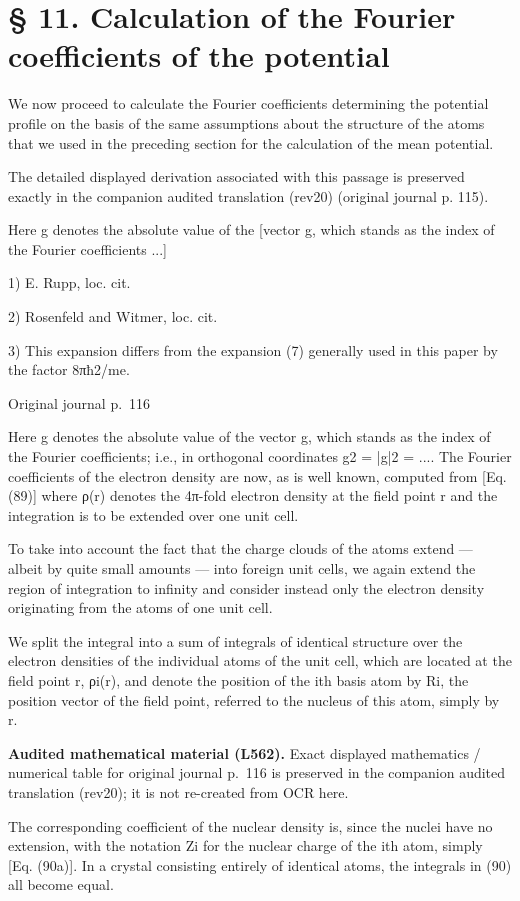 \documentclass[10pt]{article}
\newcommand{\origpage}[1]{\par\medskip\noindent\hfill{\small\color{notegray}Original journal p.~#1}\hfill\mbox{}\par\smallskip}
\newcommand{\mathref}[2]{\par\smallskip\noindent\colorbox{gray!8}{\parbox{0.95\linewidth}{\small\color{notegray}\textbf{Audited mathematical material (L#1).} Exact displayed mathematics / numerical table for original journal p.~#2 is preserved in the companion audited translation (rev20); it is not re-created from OCR here.}}\par\smallskip}
\begin{document}
\section*{§ 11. Calculation of the Fourier coefficients of the potential}
We now proceed to calculate the Fourier coefficients determining the potential profile on the basis of the same assumptions about the structure of the atoms that we used in the preceding section for the calculation of the mean potential.\par
The detailed displayed derivation associated with this passage is preserved exactly in the companion audited translation (rev20) (original journal p. 115).\par
Here g denotes the absolute value of the [vector g, which stands as the index of the Fourier coefficients ...]\par
\noindent\footnotesize 1) E. Rupp, loc. cit.\par\normalsize
\noindent\footnotesize 2) Rosenfeld and Witmer, loc. cit.\par\normalsize
\noindent\footnotesize 3) This expansion differs from the expansion (7) generally used in this paper by the factor 8πħ2/me.\par\normalsize
\origpage{116}
Here g denotes the absolute value of the vector g, which stands as the index of the Fourier coefficients; i.e., in orthogonal coordinates g2 = |g|2 = .... The Fourier coefficients of the electron density are now, as is well known, computed from [Eq. (89)] where ρ(r) denotes the 4π-fold electron density at the field point r and the integration is to be extended over one unit cell.\par
To take into account the fact that the charge clouds of the atoms extend — albeit by quite small amounts — into foreign unit cells, we again extend the region of integration to infinity and consider instead only the electron density originating from the atoms of one unit cell.\par
We split the integral into a sum of integrals of identical structure over the electron densities of the individual atoms of the unit cell, which are located at the field point r, ρi(r), and denote the position of the ith basis atom by Ri, the position vector of the field point, referred to the nucleus of this atom, simply by r.\par
\mathref{562}{116}
The corresponding coefficient of the nuclear density is, since the nuclei have no extension, with the notation Zi for the nuclear charge of the ith atom, simply [Eq. (90a)]. In a crystal consisting entirely of identical atoms, the integrals in (90) all become equal.\par
\end{document}
